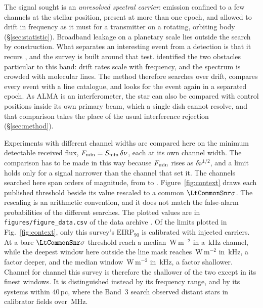 The signal sought is an \emph{unresolved spectral carrier}: emission confined
to a few channels at the stellar position, present at more than one epoch,
and allowed to drift in frequency as it must for a transmitter on a rotating,
orbiting body (\S\ref{sec:statistic}). Broadband leakage on a planetary scale
\citep{BRaTs2026} lies outside the search by construction. What separates an
interesting event from a detection is that it recurs \citep{Sheikh2021}, and
the survey is built around that test. \citet{Mason2025} identified the two
obstacles particular to this band: drift rates scale with frequency, and the
spectrum is crowded with molecular lines. The method therefore searches over
drift, compares every event with a line catalogue, and looks for the event
again in a separated epoch. As ALMA is an interferometer, the star can
also be compared with control positions inside its own primary beam, which a
single dish cannot resolve, and that comparison takes the place of the usual
interference rejection (\S\ref{sec:method}).

Experiments with different channel widths are compared here on the minimum
detectable received flux, $F_{\rm min}=S_{\rm min}\,\delta\nu$, each at its
own channel width. The comparison has to be made in this way because
$F_{\rm min}$ rises as $\delta\nu^{1/2}$, and a limit holds only for a signal
narrower than the channel that set it. The channels searched here span \LtChanSpanDex{} orders
of magnitude, from \LtChanNarrow{} to \LtChanWide.
Figure~\ref{fig:context} draws each published threshold beside its value
rescaled to a common $\LtCommonSnr\sigma$. The rescaling is an arithmetic
convention, and it does not match the false-alarm probabilities of the
different searches. The plotted values are in
\texttt{figures/figure\_data.csv} of the data archive \citep{SIdeposit}. Of the limits plotted in
Fig.~\ref{fig:context}, only this survey's $\mathrm{EIRP}_{90}$ is calibrated
with injected carriers. At a bare $\LtCommonSnr\sigma$ threshold
\citet{Mason2025} reach a median \MasonFluxMed\,W\,m$^{-2}$ in a
\MasonChanKHz\,kHz channel, while the deepest window here outside the line
mask reaches \FluxTrigBest\,W\,m$^{-2}$ in \FluxChanBestKHz\,kHz, a factor
\FluxNatBestRatio{} deeper, and the median window \FluxTrigMed\,W\,m$^{-2}$
in \FluxChanMedKHz\,kHz, a factor \FluxNatMedRatio{} shallower. Channel for
channel this survey is therefore the shallower of the two except in its
finest windows. It is distinguished instead by its frequency range, and by
its \NSysClassA{} systems within 40\,pc, where the Band~3 search observed
distant stars in \MasonNCal{} calibrator fields over \MasonBandMHz\,MHz.

